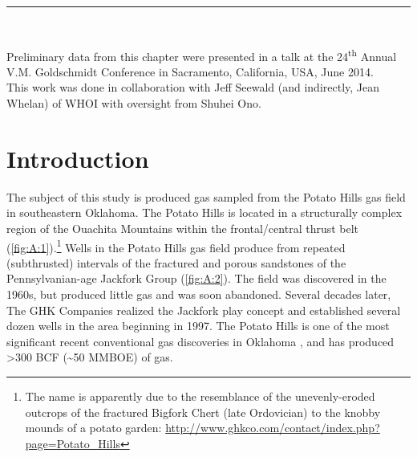 \vspace*{\fill}

\noindent \rule{\textwidth}{0.4pt}\\

{\small
	
	\noindent Preliminary data from this chapter were presented in a talk at the
	24\textsuperscript{th} Annual V.M. Goldschmidt Conference in Sacramento,
	California, USA, June 2014. \\
	
	\noindent This work was done in collaboration with Jeff Seewald (and indirectly,
	Jean Whelan) of WHOI with oversight from Shuhei Ono.
	
}

\clearpage

\section{Introduction}\label{introduction-3}




The subject of this study is produced gas sampled from the Potato Hills
gas field in southeastern Oklahoma. The Potato Hills is located in a
structurally complex region of the Ouachita Mountains within the
frontal/central thrust belt (\autoref{fig:A:1}).\footnote{The name is apparently
	due to the resemblance of the unevenly-eroded outcrops of the
	fractured Bigfork Chert (late Ordovician) to the knobby mounds of a
	potato garden:
	\url{http://www.ghkco.com/contact/index.php?page=Potato\_Hills}} Wells in
the Potato Hills gas field produce from repeated (subthrusted) intervals
of the fractured and porous sandstones of the Pennsylvanian-age Jackfork
Group (\autoref{fig:A:2}). The field was discovered in the 1960s, but produced little gas and was soon abandoned. Several decades later, The GHK Companies realized the Jackfork play concept and established several
dozen wells in the area beginning in 1997. The Potato Hills is one of
the most significant recent conventional gas discoveries in Oklahoma
\parencite{Boyd_2005_OKGN}, and has produced \textgreater{}300 BCF
(\textasciitilde{}50 MMBOE) of gas.

